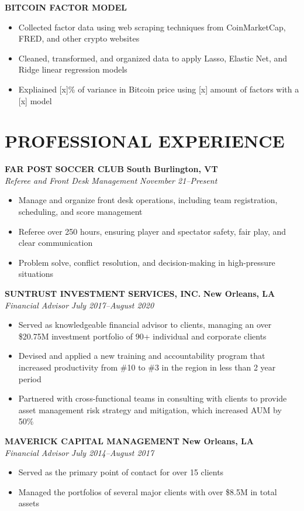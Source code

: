 \documentclass[11pt,letterpaper]{article}
\newcommand{\role}[4]{
  \begin{center}
  \textbf{#1} \hfill \textbf{#2} \\
  \textit{#3} \hfill \textit{#4}
  \end{center}
}
\begin{document}
\begin{flushleft}
  \textbf{BITCOIN FACTOR MODEL}
  \begin{itemize}[leftmargin=*,nosep]
    \item Collected factor data using web scraping techniques from CoinMarketCap, FRED, and other crypto websites
    \item Cleaned, transformed, and organized data to apply Lasso, Elastic Net, and Ridge linear regression models 
    \item Expliained [x]\% of variance in Bitcoin price using [x] amount of factors with a [x] model
  \end{itemize}
\end{flushleft}

\section{PROFESSIONAL EXPERIENCE}
\vspace{1em}
\role{FAR POST SOCCER CLUB}{South Burlington, VT}{Referee and Front Desk Management}{November 21--Present}
\begin{itemize}[leftmargin=*,nosep]
  \item Manage and organize front desk operations, including team registration, scheduling, and score management
  \item Referee over 250 hours, ensuring player and spectator safety, fair play, and clear communication
  \item Problem solve, conflict resolution, and decision-making in high-pressure situations
\end{itemize}

\role{SUNTRUST INVESTMENT SERVICES, INC.}{New Orleans, LA}{Financial Advisor}{July 2017--August 2020}
\begin{itemize}[leftmargin=*,nosep,topsep=0pt]
  \item Served as knowledgeable financial advisor to clients, managing an over \$20.75M investment portfolio of 90+ individual and corporate clients
  \item Devised and applied a new training and accountability program that increased productivity from \#10 to \#3 in the region in less than 2 year period
  \item Partnered with cross-functional teams in consulting with clients to provide asset management risk strategy and mitigation, which increased AUM by 50\%
\end{itemize}

\role{MAVERICK CAPITAL MANAGEMENT}{New Orleans, LA}{Financial Advisor}{July 2014--August 2017}
\begin{itemize}[leftmargin=*,nosep,topsep=0pt]
  \item Served as the primary point of contact for over 15 clients
  \item Managed the portfolios of several major clients with over \$8.5M in total assets
\end{itemize}
\end{document}
